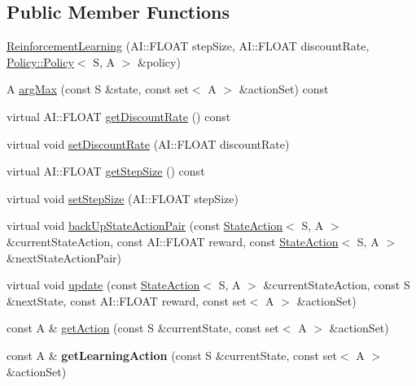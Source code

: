 \subsection*{Public Member Functions}
\begin{DoxyCompactItemize}
\item 
\hyperlink{classAI_1_1Algorithm_1_1ReinforcementLearning_a4d182d91c68aef838b80843acd044b1e}{Reinforcement\-Learning} (A\-I\-::\-F\-L\-O\-A\-T step\-Size, A\-I\-::\-F\-L\-O\-A\-T discount\-Rate, \hyperlink{classAI_1_1Algorithm_1_1Policy_1_1Policy}{Policy\-::\-Policy}$<$ S, A $>$ \&policy)
\item 
A \hyperlink{classAI_1_1Algorithm_1_1ReinforcementLearning_ad1d8a8ebb47fb71a53b15b770795e286}{arg\-Max} (const S \&state, const set$<$ A $>$ \&action\-Set) const 
\item 
virtual A\-I\-::\-F\-L\-O\-A\-T \hyperlink{classAI_1_1Algorithm_1_1ReinforcementLearning_a04edb957e23dde9c6733668ad844c32b}{get\-Discount\-Rate} () const 
\item 
virtual void \hyperlink{classAI_1_1Algorithm_1_1ReinforcementLearning_a1fc1e11a3ddb4377c4d6813a95ce87f4}{set\-Discount\-Rate} (A\-I\-::\-F\-L\-O\-A\-T discount\-Rate)
\item 
virtual A\-I\-::\-F\-L\-O\-A\-T \hyperlink{classAI_1_1Algorithm_1_1ReinforcementLearning_a13e6c161a33644183d3d357971eeaaf5}{get\-Step\-Size} () const 
\item 
virtual void \hyperlink{classAI_1_1Algorithm_1_1ReinforcementLearning_a04932645faa6c385e4c587f7f845b484}{set\-Step\-Size} (A\-I\-::\-F\-L\-O\-A\-T step\-Size)
\item 
virtual void \hyperlink{classAI_1_1Algorithm_1_1ReinforcementLearning_aa45b49ec954f6934df4d541b70076bd6}{back\-Up\-State\-Action\-Pair} (const \hyperlink{classAI_1_1StateAction}{State\-Action}$<$ S, A $>$ \&current\-State\-Action, const A\-I\-::\-F\-L\-O\-A\-T reward, const \hyperlink{classAI_1_1StateAction}{State\-Action}$<$ S, A $>$ \&next\-State\-Action\-Pair)
\item 
virtual void \hyperlink{classAI_1_1Algorithm_1_1ReinforcementLearning_a25d7fa245a79e61061436dc0f1db90cb}{update} (const \hyperlink{classAI_1_1StateAction}{State\-Action}$<$ S, A $>$ \&current\-State\-Action, const S \&next\-State, const A\-I\-::\-F\-L\-O\-A\-T reward, const set$<$ A $>$ \&action\-Set)
\item 
const A \& \hyperlink{classAI_1_1Algorithm_1_1ReinforcementLearning_acb89c1734df6658a422af510b7c36377}{get\-Action} (const S \&current\-State, const set$<$ A $>$ \&action\-Set)
\item 
\hypertarget{classAI_1_1Algorithm_1_1ReinforcementLearning_a9f31822bf51b07d17b31d7683d7e25a2}{const A \& {\bfseries get\-Learning\-Action} (const S \&current\-State, const set$<$ A $>$ \&action\-Set)}\label{classAI_1_1Algorithm_1_1ReinforcementLearning_a9f31822bf51b07d17b31d7683d7e25a2}


\end{DoxyCompactItemize}
